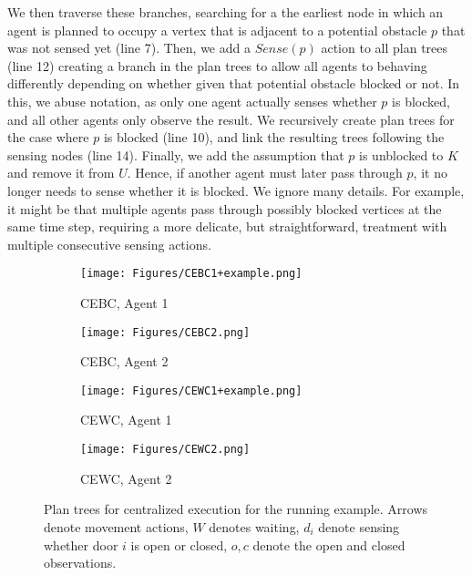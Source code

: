 \documentclass[letterpaper]{article} %
\begin{document}
We then traverse these branches, searching for a the earliest node in which an agent is planned to occupy a vertex that is adjacent to a potential obstacle $p$ that was not sensed yet (line 7).
Then, we add a $Sense(p)$ action to all plan trees (line 12)  creating a branch in the plan trees to allow all agents to behaving differently depending on whether given that potential obstacle blocked or not.
In this, we abuse notation, as only one agent actually senses whether $p$ is blocked, and all other agents only observe the result.
We recursively create plan trees for the case where $p$ is blocked (line 10), and link the resulting trees following the sensing nodes (line 14).
Finally, we add the assumption that $p$ is unblocked to $K$ and remove it from $U$. Hence, if another agent must later pass through $p$, it no longer needs to sense whether it is blocked.
We ignore many details. For example, it might be that multiple agents pass through possibly blocked vertices at the same time step, requiring a more delicate, but straightforward, treatment with multiple consecutive sensing actions.
\begin{figure}[t]
    \begin{subfigure}[b]{0.4\textwidth}
      \texttt{[image: Figures/CEBC1+example.png]}
      \caption{CEBC, Agent 1}\label{fig:CEBC1}
    \end{subfigure}
    \begin{subfigure}[b]{0.4\textwidth}
      \texttt{[image: Figures/CEBC2.png]}
      \caption{CEBC, Agent 2}\label{fig:CEBC2}
    \end{subfigure}
    \begin{subfigure}[b]{0.4\textwidth}
      \texttt{[image: Figures/CEWC1+example.png]}
      \caption{CEWC, Agent 1}\label{fig:CEWC1}
    \end{subfigure}
    \begin{subfigure}[b]{0.4\textwidth}
      \texttt{[image: Figures/CEWC2.png]}
      \caption{CEWC, Agent 2}\label{fig:CEWC2}
    \end{subfigure}
    \caption{Plan trees for centralized execution for the running example. Arrows denote movement actions, $W$ denotes waiting, $d_i$ denote sensing whether door $i$ is open or closed, $o,c$ denote the open and closed observations.}
\end{figure}
\end{document}
